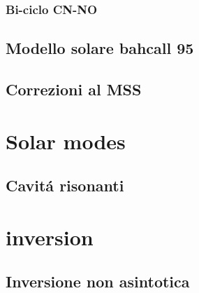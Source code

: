 \documentclass[oneside,12pt,fleqn]{memoir}%
\begin{document}
\begin{comment}
\node[box,below=0.5cm of tlithium7]  (li7) {$\cel{Be}{7}{}{}+\Pelectron\to\cel{Li}{7}{}{}+\Pnue$};%
\node[box,below=0.5cm of li7,label={[xshift=0.1cm, yshift=-1.5cm]PPII}] (pp2) {$\cel{Li}{7}{}{}+\Pproton\to2\cel{He}{4}{}{}$};%

\node[box,below=0.5cm of tboron8]  (b8) {$\cel{Be}{7}{}{}+\Pproton\to\cel{B}{8}{}{}+\Pphoton$};%
\node[box,below=0.25cm of b8]  (be7) {$\cel{B}{8}{}{}\to\cel{Be}{8}{}{}^*+\APelectron+\Pnue$};%
\node[box,below=0.25cm of be7,label={[xshift=0.1cm, yshift=-1.5cm]PPIII}]  (pp3) {$\cel{Be}{8}{}{}^*\to2\cel{He}{4}{}{}$};%

\draw[->-] (berillium7.south)--(bberillium7);
\draw[] (bberillium7)--(tlithium7);
\draw[] (bberillium7)--(tboron8);

\draw[->-] (tlithium7)--(li7.north);
\draw[->-] (li7.south)--(pp2.north);

\draw[->-] (tboron8.south)--(b8.north);
\draw[->-] (b8.south)--(be7.north);
\draw[->-] (be7.south)--(pp3.north);

\end{tikzpicture}
\endgroup

\clearpage

\end{comment}

\subsection{Bi-ciclo CN-NO}

\section{Modello solare bahcall 95}

\clearpage

%



\section{Correzioni al MSS}

\clearpage
%



\chapter{Solar modes}

\section{Cavit\'a risonanti}

%


\chapter{inversion}

\section{Inversione non asintotica}

%

\clearpage
{}
\printindex
\end{document}
